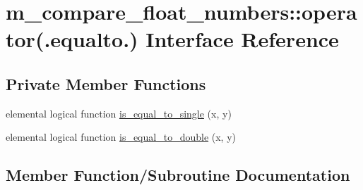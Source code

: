 \hypertarget{interfacem__compare__float__numbers_1_1operator_07_8equalto_8_08}{}\section{m\+\_\+compare\+\_\+float\+\_\+numbers\+:\+:operator(.equalto.) Interface Reference}
\label{interfacem__compare__float__numbers_1_1operator_07_8equalto_8_08}
\subsection*{Private Member Functions}
\begin{DoxyCompactItemize}
\item 
elemental logical function \hyperlink{interfacem__compare__float__numbers_1_1operator_07_8equalto_8_08_ace32ebbc1210a68a9bdd0e50faadff23}{is\+\_\+equal\+\_\+to\+\_\+single} (x, y)
\item 
elemental logical function \hyperlink{interfacem__compare__float__numbers_1_1operator_07_8equalto_8_08_ac50ec49503f3f8c2de2b8075f9344b80}{is\+\_\+equal\+\_\+to\+\_\+double} (x, y)
\end{DoxyCompactItemize}


\subsection{Member Function/\+Subroutine Documentation}
\mbox{\label{interfacem__compare__float__numbers_1_1operator_07_8equalto_8_08_ac50ec49503f3f8c2de2b8075f9344b80}} 
